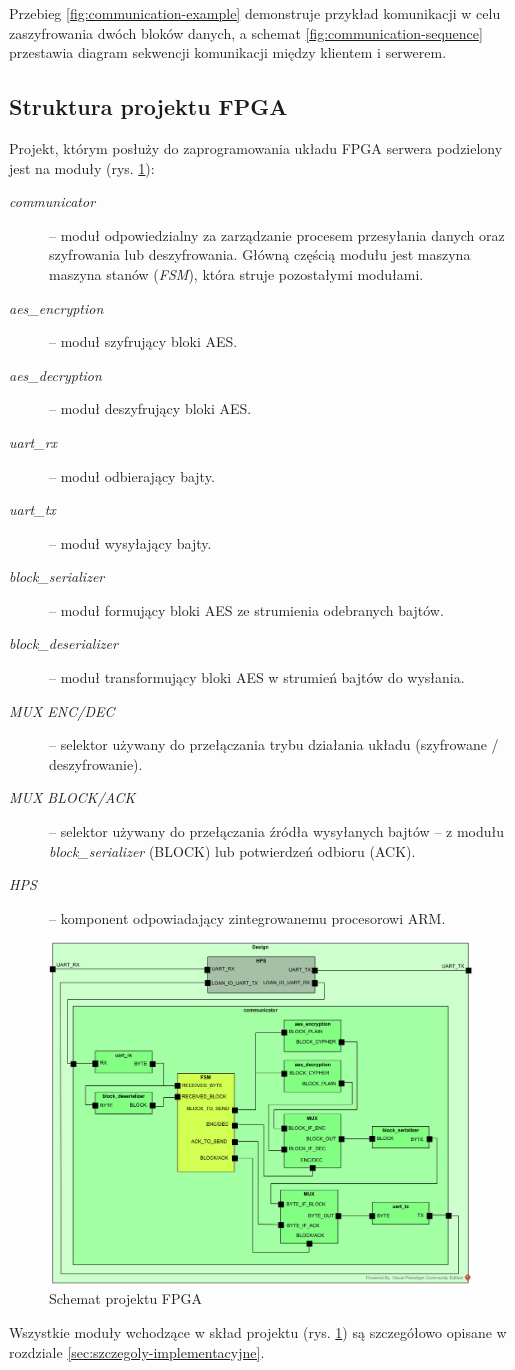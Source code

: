 Przebieg \ref{fig:communication-example} demonstruje przykład komunikacji w celu zaszyfrowania dwóch bloków danych, a schemat \ref{fig:communication-sequence} przestawia diagram sekwencji komunikacji między klientem i serwerem.

\newpage
\subsection{Struktura projektu FPGA}
Projekt, którym posłuży do zaprogramowania układu FPGA serwera podzielony jest na moduły (rys. \ref{fig:modules}):
\begin{description}
\item[\textit{communicator}] -- moduł odpowiedzialny za zarządzanie procesem przesyłania danych oraz szyfrowania lub deszyfrowania. Główną częścią modułu jest maszyna maszyna stanów (\textit{FSM}), która struje pozostałymi modułami.
\item[\textit{aes\_encryption}] -- moduł szyfrujący bloki AES.
\item[\textit{aes\_decryption}] -- moduł deszyfrujący bloki AES.
\item[\textit{uart\_rx}] -- moduł odbierający bajty.
\item[\textit{uart\_tx}] -- moduł wysyłający bajty.
\item[\textit{block\_serializer}] -- moduł formujący bloki AES ze strumienia odebranych bajtów.
\item[\textit{block\_deserializer}] -- moduł transformujący bloki AES w strumień bajtów do wysłania.
\item[\textit{MUX ENC/DEC}] -- selektor używany do przełączania trybu działania układu (szyfrowane / deszyfrowanie).
\item[\textit{MUX BLOCK/ACK}] -- selektor używany do przełączania źródła wysyłanych bajtów -- z modułu \textit{block\_serializer} (BLOCK) lub potwierdzeń odbioru (ACK).
\item[\textit{HPS}] -- komponent odpowiadający zintegrowanemu procesorowi ARM.
\end{description}

\begin{figure}[!h]
\centering
\includegraphics[width=\textwidth]{pictures/modules.png}
\caption{Schemat projektu FPGA}
\label{fig:modules}
\end{figure}

Wszystkie moduły wchodzące w skład projektu (rys. \ref{fig:modules}) są szczegółowo opisane w rozdziale \ref{sec:szczegoly-implementacyjne}.